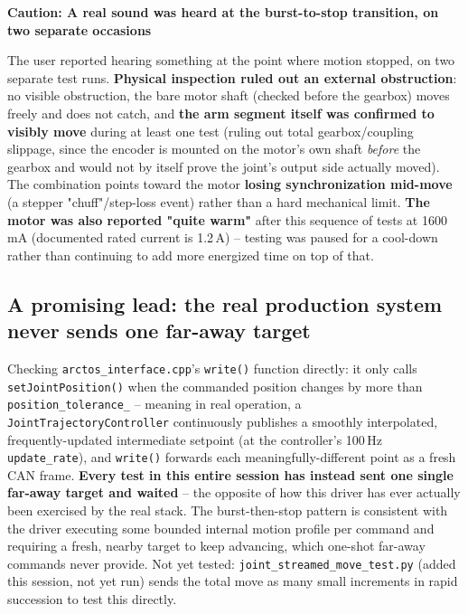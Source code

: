 \documentclass[11pt,letterpaper]{article}
\newenvironment{caution}[1]{%
    \par\addvspace{8pt}%
    \noindent{\color{cautionred}\rule{\linewidth}{0.8pt}}\par\vspace{2pt}
    \noindent\textbf{\color{cautionred}Caution: #1}\par\vspace{2pt}
}{%
    \par\vspace{2pt}\noindent{\color{cautionred}\rule{\linewidth}{0.4pt}}%
    \par\addvspace{8pt}%
}
\begin{document}
\begin{caution}{A real sound was heard at the burst-to-stop transition, on two separate occasions}
The user reported hearing something at the point where motion stopped, on two separate test runs. \textbf{Physical inspection ruled out an external obstruction}: no visible obstruction, the bare motor shaft (checked before the gearbox) moves freely and does not catch, and \textbf{the arm segment itself was confirmed to visibly move} during at least one test (ruling out total gearbox/coupling slippage, since the encoder is mounted on the motor's own shaft \emph{before} the gearbox and would not by itself prove the joint's output side actually moved). The combination points toward the motor \textbf{losing synchronization mid-move} (a stepper "chuff"/step-loss event) rather than a hard mechanical limit. \textbf{The motor was also reported "quite warm"} after this sequence of tests at 1600\,mA (documented rated current is 1.2\,A) -- testing was paused for a cool-down rather than continuing to add more energized time on top of that.
\end{caution}

\subsection{A promising lead: the real production system never sends one far-away target}
Checking \texttt{arctos\_interface.cpp}'s \texttt{write()} function directly: it only calls \texttt{setJointPosition()} when the commanded position changes by more than \texttt{position\_tolerance\_} -- meaning in real operation, a \texttt{JointTrajectoryController} continuously publishes a smoothly interpolated, frequently-updated intermediate setpoint (at the controller's 100\,Hz \texttt{update\_rate}), and \texttt{write()} forwards each meaningfully-different point as a fresh CAN frame. \textbf{Every test in this entire session has instead sent one single far-away target and waited} -- the opposite of how this driver has ever actually been exercised by the real stack. The burst-then-stop pattern is consistent with the driver executing some bounded internal motion profile per command and requiring a fresh, nearby target to keep advancing, which one-shot far-away commands never provide. Not yet tested: \texttt{joint\_streamed\_move\_test.py} (added this session, not yet run) sends the total move as many small increments in rapid succession to test this directly.
\end{document}
